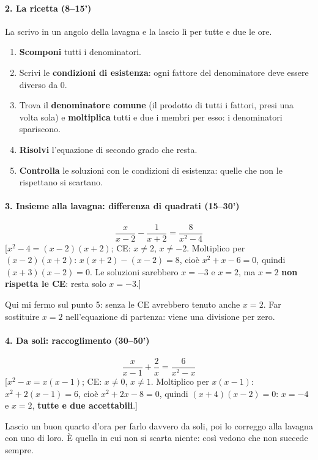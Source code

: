 \documentclass[11pt]{report}
\begin{document}
\paragraph{2. La ricetta (8--15')}
La scrivo in un angolo della lavagna e la lascio lì per tutte e due le ore.
\begin{mdframed}
    \begin{enumerate}
        \item \textbf{Scomponi} tutti i denominatori.
        \item Scrivi le \textbf{condizioni di esistenza}: ogni fattore del denominatore deve essere diverso da $0$.
        \item Trova il \textbf{denominatore comune} (il prodotto di tutti i fattori, presi una volta sola) e \textbf{moltiplica} tutti e due i membri per esso: i denominatori spariscono.
        \item \textbf{Risolvi} l'equazione di secondo grado che resta.
        \item \textbf{Controlla} le soluzioni con le condizioni di esistenza: quelle che non le rispettano si scartano.
    \end{enumerate}
\end{mdframed}

\paragraph{3. Insieme alla lavagna: differenza di quadrati (15--30')}
$$
\frac{x}{x-2}-\frac{1}{x+2}=\frac{8}{x^2-4}
$$
[$x^2-4=(x-2)(x+2)$; CE: $x\neq2$, $x\neq-2$. Moltiplico per $(x-2)(x+2)$: $x(x+2)-(x-2)=8$, cioè $x^2+x-6=0$, quindi $(x+3)(x-2)=0$. Le soluzioni sarebbero $x=-3$ e $x=2$, ma $x=2$ \textbf{non rispetta le CE}: resta solo $x=-3$.]

Qui mi fermo sul punto 5: senza le CE avrebbero tenuto anche $x=2$. Far sostituire $x=2$ nell'equazione di partenza: viene una divisione per zero.

\paragraph{4. Da soli: raccoglimento (30--50')}
$$
\frac{x}{x-1}+\frac{2}{x}=\frac{6}{x^2-x}
$$
[$x^2-x=x(x-1)$; CE: $x\neq0$, $x\neq1$. Moltiplico per $x(x-1)$: $x^2+2(x-1)=6$, cioè $x^2+2x-8=0$, quindi $(x+4)(x-2)=0$: $x=-4$ e $x=2$, \textbf{tutte e due accettabili}.]

Lascio un buon quarto d'ora per farlo davvero da soli, poi lo correggo alla lavagna con uno di loro. È quella in cui non si scarta niente: così vedono che non succede sempre.
\end{document}
